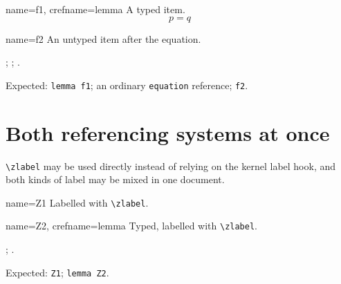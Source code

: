 \documentclass{article}
\begin{document}
\begin{prop}
  \item[name=f1, crefname=lemma] A typed item. \label{z:f1}
  \begin{equation} p = q \label{z:feq} \end{equation}
  \item[name=f2] An untyped item after the equation. \label{z:f2}
\end{prop}

; ; .

Expected: \texttt{lemma f1}; an ordinary \texttt{equation} reference;
\texttt{f2}.

\section{Both referencing systems at once}

\verb|\zlabel| may be used directly instead of relying on the kernel label
hook, and both kinds of label may be mixed in one document.

\begin{prop}
  \item[name=Z1] Labelled with \verb|\zlabel|. 
  \item[name=Z2, crefname=lemma] Typed, labelled with \verb|\zlabel|.
\end{prop}

; .

Expected: \texttt{Z1}; \texttt{lemma Z2}.
\end{document}
